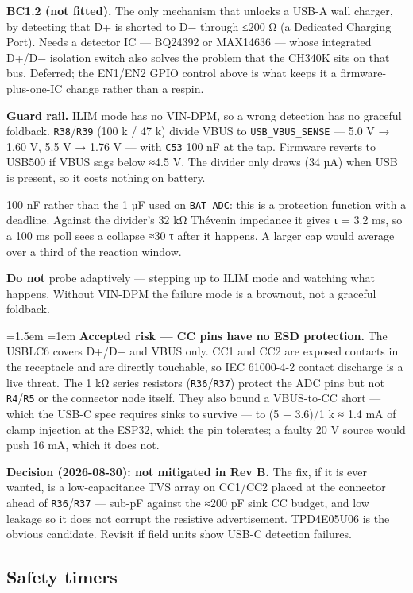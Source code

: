 \documentclass[11pt]{article}
\newenvironment{callout}
  {\par\medskip\noindent\begin{minipage}{\linewidth}\color{black}%
   \setlength{\parskip}{4pt}\leftskip=1.5em \rightskip=1em\relax}
  {\end{minipage}\par\medskip}
\begin{document}
\textbf{BC1.2 (not fitted).} The only mechanism that unlocks a USB-A wall charger, by detecting that
D+ is shorted to D− through ≤200 Ω (a Dedicated Charging Port). Needs a detector IC — BQ24392 or
MAX14636 — whose integrated D+/D− isolation switch also solves the problem that the CH340K sits on
that bus. Deferred; the EN1/EN2 GPIO control above is what keeps it a firmware-plus-one-IC change
rather than a respin.

\textbf{Guard rail.} ILIM mode has no VIN-DPM, so a wrong detection has no graceful foldback.
\texttt{R38}/\texttt{R39} (100 k / 47 k) divide VBUS to \texttt{USB_VBUS_SENSE} — 5.0 V → 1.60 V,
5.5 V → 1.76 V — with \texttt{C53} 100 nF at the tap. Firmware reverts to USB500 if VBUS sags below
≈4.5 V. The divider only draws (34 µA) when USB is present, so it costs nothing on battery.

100 nF rather than the 1 µF used on \texttt{BAT_ADC}: this is a protection function with a deadline.
Against the divider's 32 kΩ Thévenin impedance it gives τ = 3.2 ms, so a 100 ms poll sees a collapse
≈30 τ after it happens. A larger cap would average over a third of the reaction window.

\textbf{Do not} probe adaptively — stepping up to ILIM mode and watching what happens. Without
VIN-DPM the failure mode is a brownout, not a graceful foldback.

\begin{callout}
\textbf{Accepted risk — CC pins have no ESD protection.} The USBLC6 covers D+/D− and VBUS only. CC1
and CC2 are exposed contacts in the receptacle and are directly touchable, so IEC 61000-4-2 contact
discharge is a live threat. The 1 kΩ series resistors (\texttt{R36}/\texttt{R37}) protect the ADC
pins but not \texttt{R4}/\texttt{R5} or the connector node itself. They also bound a VBUS-to-CC
short — which the USB-C spec requires sinks to survive — to (5 − 3.6)/1 k ≈ 1.4 mA of clamp injection
at the ESP32, which the pin tolerates; a faulty 20 V source would push 16 mA, which it does not.

\textbf{Decision (2026-08-30): not mitigated in Rev B.} The fix, if it is ever wanted, is a
low-capacitance TVS array on CC1/CC2 placed at the connector ahead of \texttt{R36}/\texttt{R37} —
sub-pF against the ≈200 pF sink CC budget, and low leakage so it does not corrupt the resistive
advertisement. TPD4E05U06 is the obvious candidate. Revisit if field units show USB-C detection
failures.
\end{callout}

\subsection{Safety timers}
\end{document}

